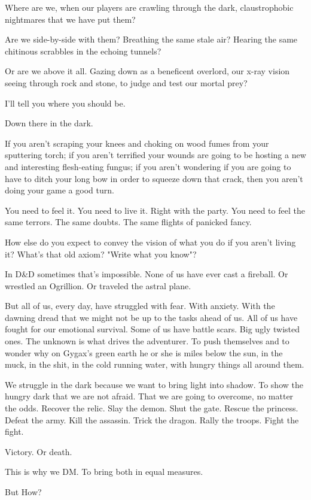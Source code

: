 Where are we, when our players are crawling through the dark, claustrophobic nightmares that we have put them?\par
Are we side-by-side with them? Breathing the same stale air? Hearing the same chitinous scrabbles in the echoing tunnels?\par
Or are we above it all. Gazing down as a beneficent overlord, our x-ray vision seeing through rock and stone, to judge and test our mortal prey?\par
I'll tell you where you should be.\par
Down there in the dark.\par
If you aren't scraping your knees and choking on wood fumes from your sputtering torch; if you aren't terrified your wounds are going to be hosting a new and interesting flesh-eating fungus; if you aren't wondering if you are going to have to ditch your long bow in order to squeeze down that crack, then you aren't doing your game a good turn.\par
You need to feel it. You need to live it. Right with the party. You need to feel the same terrors. The same doubts. The same flights of panicked fancy.\par
How else do you expect to convey the vision of what you do if you aren't living it? What's that old axiom? "Write what you know"?\par
In D\&D sometimes that's impossible. None of us have ever cast a fireball. Or wrestled an Ogrillion. Or traveled the astral plane.\par
But all of us, every day, have struggled with fear. With anxiety. With the dawning dread that we might not be up to the tasks ahead of us. All of us have fought for our emotional survival. Some of us have battle scars. Big ugly twisted ones.
The unknown is what drives the adventurer. To push themselves and to wonder why on Gygax's green earth he or she is miles below the sun, in the muck, in the shit, in the cold running water, with hungry things all around them.\par
We struggle in the dark because we want to bring light into shadow. To show the hungry dark that we are not afraid. That we are going to overcome, no matter the odds.
Recover the relic. Slay the demon. Shut the gate. Rescue the princess. Defeat the army. Kill the assassin. Trick the dragon. Rally the troops. Fight the fight.\par
Victory. Or death.\par
This is why we DM. To bring both in equal measures.\par
But How?\par
